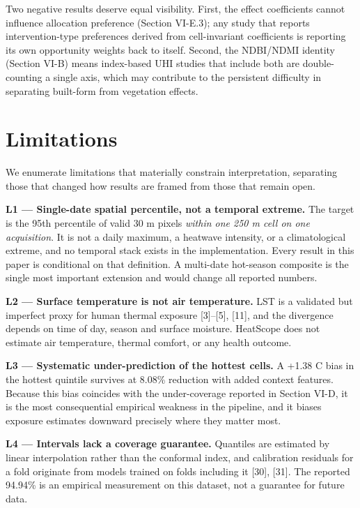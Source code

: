 \documentclass[conference]{IEEEtran}
\begin{document}
Two negative results deserve equal visibility. First, the effect coefficients cannot influence
allocation preference (Section VI-E.3); any study that reports intervention-type preferences derived
from cell-invariant coefficients is reporting its own opportunity weights back to itself. Second,
the NDBI/NDMI identity (Section VI-B) means index-based UHI studies that include both are
double-counting a single axis, which may contribute to the persistent difficulty in separating
built-form from vegetation effects.

\section{Limitations}\label{viii.-limitations}

We enumerate limitations that materially constrain interpretation, separating those that changed how
results are framed from those that remain open.

\textbf{L1 --- Single-date spatial percentile, not a temporal extreme.} The target is the 95th percentile of
valid 30 m pixels \emph{within one 250 m cell on one acquisition}. It is not a daily maximum, a heatwave
intensity, or a climatological extreme, and no temporal stack exists in the implementation. Every
result in this paper is conditional on that definition. A multi-date hot-season composite is the single
most important extension and would change all reported numbers.

\textbf{L2 --- Surface temperature is not air temperature.} LST is a validated but imperfect proxy for human
thermal exposure {[}3{]}--{[}5{]}, {[}11{]}, and the divergence depends on time of day, season and surface
moisture. HeatScope does not estimate air temperature, thermal comfort, or any health outcome.

\textbf{L3 --- Systematic under-prediction of the hottest cells.} A +1.38 \textdegree{}C bias in the hottest quintile
survives at 8.08\% reduction with added context features. Because this bias coincides with the
under-coverage reported in Section VI-D, it is the most consequential empirical weakness in the
pipeline, and it biases exposure estimates downward precisely where they matter most.

\textbf{L4 --- Intervals lack a coverage guarantee.} Quantiles are estimated by linear interpolation rather
than the conformal index, and calibration residuals for a fold originate from models trained on folds
including it {[}30{]}, {[}31{]}. The reported 94.94\% is an empirical measurement on this dataset, not a
guarantee for future data.
\end{document}
